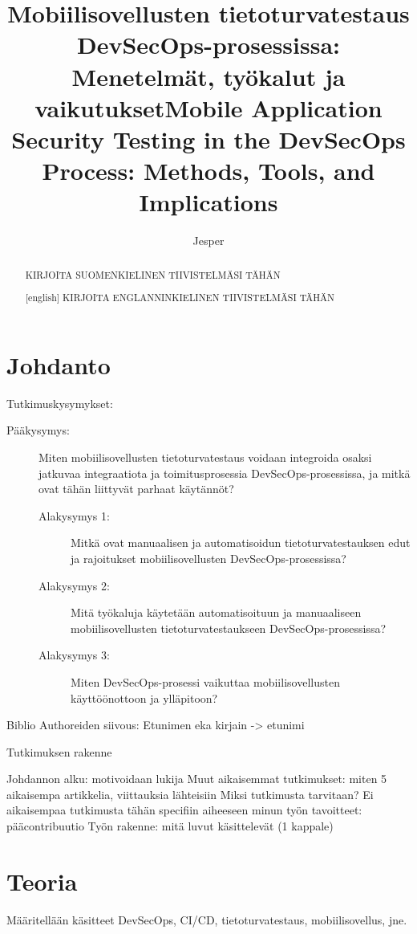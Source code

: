 \documentclass[bscthesis,finnish,oneside,biblatex]{uefcsthesis}
\title{Mobiilisovellusten tietoturvatestaus DevSecOps-prosessissa: Menetelmät, työkalut ja vaikutukset} %
\title[english]{Mobile Application Security Testing in the DevSecOps Process: Methods, Tools, and Implications} %
\author{Jesper}{Kauppinen} %
\date{\thismonth} %
\begin{document}
\maketitle
\begin{abstract}
KIRJOITA SUOMENKIELINEN TIIVISTELMÄSI TÄHÄN
\end{abstract}

\begin{abstract}[english]
KIRJOITA ENGLANNINKIELINEN TIIVISTELMÄSI TÄHÄN
\end{abstract}

\frontmatter
\tableofcontents
\mainmatter

\chapter{Johdanto}
\label{cha:johdanto}

Tutkimuskysymykset:

\begin{description}
    \item[Pääkysymys:] Miten mobiilisovellusten tietoturvatestaus voidaan integroida osaksi jatkuvaa integraatiota ja toimitusprosessia DevSecOps-prosessissa, ja mitkä ovat tähän liittyvät parhaat käytännöt?
    \begin{description}
        \item[Alakysymys 1:] Mitkä ovat manuaalisen ja automatisoidun tietoturvatestauksen edut ja rajoitukset mobiilisovellusten DevSecOps-prosessissa?
        \item[Alakysymys 2:] Mitä työkaluja käytetään automatisoituun ja manuaaliseen mobiilisovellusten tietoturvatestaukseen DevSecOps-prosessissa?
        \item[Alakysymys 3:] Miten DevSecOps-prosessi vaikuttaa mobiilisovellusten käyttöönottoon ja ylläpitoon?
    \end{description}
\end{description}

Biblio Authoreiden siivous:
Etunimen eka kirjain -> etunimi

Tutkimuksen rakenne

Johdannon alku:
motivoidaan lukija
Muut aikaisemmat tutkimukset: miten 5 aikaisempa artikkelia, viittauksia lähteisiin
Miksi tutkimusta tarvitaan? Ei aikaisempaa tutkimusta tähän specifiin aiheeseen
minun työn tavoitteet: pääcontribuutio
Työn rakenne: mitä luvut käsittelevät (1 kappale)

\chapter{Teoria}
\label{cha:teoria}
Määritellään käsitteet DevSecOps, CI/CD, tietoturvatestaus, mobiilisovellus, jne.
\end{document}
